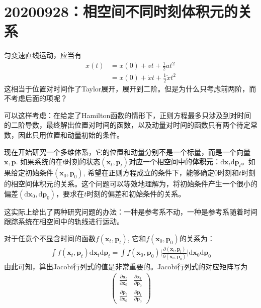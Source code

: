 \documentclass[12pt]{article}
\begin{document}
\section{20200928：相空间不同时刻体积元的关系}
匀变速直线运动，应当有
\begin{align*}
    x(t) &= x(0) + vt + \frac 12 at^2\\
    &= x(0) + \dot{x}t + \frac 12 \ddot{x}t^2
\end{align*}
这相当于位置对时间作了Taylor展开，展开到二阶。但是为什么只考虑前两阶，而不考虑后面的项呢？

可以这样考虑：在给定了Hamilton函数的情形下，正则方程最多只涉及到对时间的二阶导数，最终解出位置对时间的函数，以及动量对时间的函数只有两个待定常数，因此只用位置和动量初始的条件。

现在开始研究一个多维体系，它的位置和动量分别不是一个标量，而是一个向量$\bm{x}, \bm{p}$. 如果系统的在$t$时刻的状态$(\bm{x}_t,\bm{p}_t)$对应一个相空间中的\textbf{体积元}：$\mathrm{d}\bm{x}_t\mathrm{d}\bm{p}_t$。如果给定初始条件$(\bm{x}_0,\bm{p}_0)$, 希望在正则方程成立的条件下，能够确定0时刻和$t$时刻的相空间体积元的关系。这个问题可以等效地理解为，将初始条件产生一个很小的偏差$(\mathrm{d}\bm{x}_0,\mathrm{d}\bm{p}_0)$，要求在$t$时刻的偏差和初始条件的关系。

这实际上给出了两种研究问题的办法：一种是参考系不动，一种是参考系随着时间跟踪系统在相空间中的轨线进行运动。

对于任意个不显含时间的函数$f(\bm{x}_t,\bm{p}_t)$, 它和$f(\bm{x}_0,\bm{p}_0)$的关系为：
\begin{align*}
    \int f(\bm{x}_t,\bm{p}_t) \mathrm{d}\bm{x}_t\mathrm{d}\bm{p}_t = \int f(\bm{x}_0,\bm{p}_0)\bigg|\frac {\partial (\bm{x}_t, \bm{p}_t)}{\partial (\bm{x}_0,\bm{p}_0)}\bigg| \mathrm{d}\bm{x}_0 \mathrm{d}\bm{p}_0
\end{align*}
由此可知，算出Jacobi行列式的值是非常重要的。Jacobi行列式的对应矩阵写为
\begin{align*}
    \begin{pmatrix}
        \frac {\partial \bm{x}_t}{\partial \bm{x}_0} & \frac {\partial \bm{x}_t}{\partial \bm{p}_0}\\
        \frac {\partial \bm{p}_t}{\partial \bm{x}_0} & \frac {\partial \bm{p}_t}{\partial \bm{p}_0}
    \end{pmatrix}
\end{align*}
\end{document}
